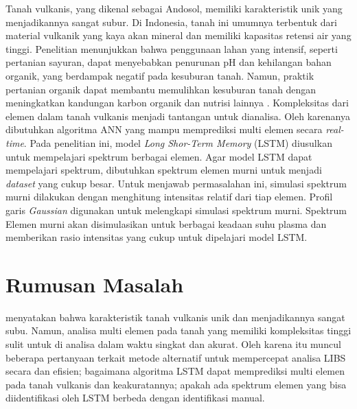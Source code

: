 \par Tanah vulkanis, yang dikenal sebagai Andosol, memiliki karakteristik unik yang menjadikannya sangat subur. Di Indonesia, tanah ini umumnya terbentuk dari material vulkanik yang kaya akan mineral dan memiliki kapasitas retensi air yang tinggi. Penelitian menunjukkan bahwa penggunaan lahan yang intensif, seperti pertanian sayuran, dapat menyebabkan penurunan pH dan kehilangan bahan organik, yang berdampak negatif pada kesuburan tanah. Namun, praktik pertanian organik dapat membantu memulihkan kesuburan tanah dengan meningkatkan kandungan karbon organik dan nutrisi lainnya \citep{fiantis2020land}. Kompleksitas dari elemen dalam tanah vulkanis menjadi tantangan untuk dianalisa. Oleh karenanya dibutuhkan algoritma ANN yang mampu memprediksi multi elemen secara \textit{real-time}. Pada penelitian ini, model  \textit{Long Shor-Term Memory} (LSTM) diusulkan untuk mempelajari spektrum berbagai elemen. Agar model LSTM dapat mempelajari spektrum, dibutuhkan spektrum elemen murni untuk menjadi \textit{dataset} yang cukup besar. Untuk menjawab permasalahan ini, simulasi spektrum murni dilakukan dengan menghitung intensitas relatif dari tiap elemen. Profil garis \textit{Gaussian} digunakan untuk melengkapi simulasi spektrum murni. Spektrum Elemen murni akan disimulasikan untuk berbagai keadaan suhu plasma dan memberikan rasio intensitas yang cukup untuk dipelajari model LSTM.


\section{Rumusan Masalah}
\par \cite{fiantis2020land} menyatakan bahwa karakteristik tanah vulkanis unik dan menjadikannya sangat subu. Namun, analisa multi elemen pada tanah yang memiliki kompleksitas tinggi sulit untuk di analisa dalam waktu singkat dan akurat. Oleh karena itu muncul beberapa pertanyaan terkait metode alternatif untuk mempercepat analisa LIBS secara  dan efisien; bagaimana algoritma LSTM dapat memprediksi multi elemen pada tanah vulkanis dan keakuratannya; apakah ada spektrum elemen yang bisa diidentifikasi oleh LSTM berbeda dengan identifikasi manual.


